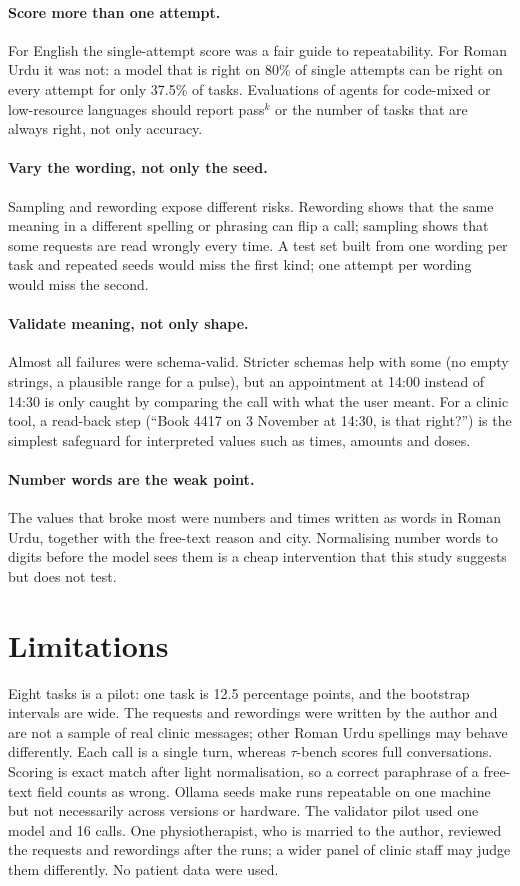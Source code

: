 \documentclass[11pt,a4paper]{article}
\newcommand{\passk}[1]{pass$^{#1}$}
\begin{document}
\paragraph{Score more than one attempt.} For English the single-attempt score was a fair guide to repeatability.
For Roman Urdu it was not: a model that is right on 80\% of single attempts can be right on every attempt for only
37.5\% of tasks. Evaluations of agents for code-mixed or low-resource languages should report \passk{k} or the
number of tasks that are always right, not only accuracy.

\paragraph{Vary the wording, not only the seed.} Sampling and rewording expose different risks. Rewording shows
that the same meaning in a different spelling or phrasing can flip a call; sampling shows that some requests are
read wrongly every time. A test set built from one wording per task and repeated seeds would miss the first kind;
one attempt per wording would miss the second.

\paragraph{Validate meaning, not only shape.} Almost all failures were schema-valid. Stricter schemas help with
some (no empty strings, a plausible range for a pulse), but an appointment at 14:00 instead of 14:30 is only caught by
comparing the call with what the user meant. For a clinic tool, a read-back step (``Book 4417 on 3 November at
14:30, is that right?'') is the simplest safeguard for interpreted values such as times, amounts and doses.

\paragraph{Number words are the weak point.} The values that broke most were numbers and times written as words in
Roman Urdu, together with the free-text reason and city. Normalising number words to digits before the model sees
them is a cheap intervention that this study suggests but does not test.

\section{Limitations}

Eight tasks is a pilot: one task is 12.5 percentage points, and the bootstrap intervals are wide. The requests and
rewordings were written by the author and are not a sample of real clinic messages; other Roman Urdu spellings may
behave differently. Each call is a single turn, whereas $\tau$-bench scores full conversations. Scoring is exact match
after light normalisation, so a correct paraphrase of a free-text field counts as wrong. Ollama seeds make runs
repeatable on one machine but not necessarily across versions or hardware. The validator pilot used one model and
16 calls. One physiotherapist, who is married to the author, reviewed the requests and rewordings after the runs; a wider panel of clinic staff may judge them differently. No patient data were used.
\end{document}
